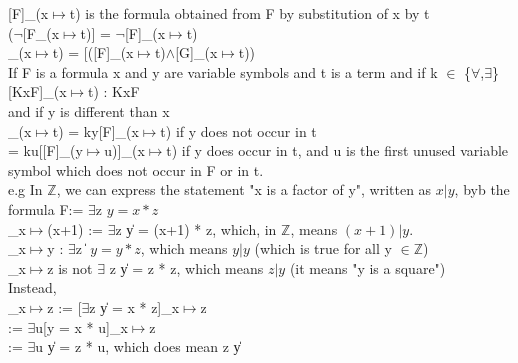 \documentclass[10pt,letter]{article}
\begin{document}
[F]_(x$\mapsto$t) is the formula obtained from F by substitution of x by t\\
($\neg$[F_(x$\mapsto$t)] = $\neg$[F]_(x$\mapsto$t)\\
[(F$\wedge$G)]_(x$\mapsto$t) = [([F]_(x$\mapsto$t)$\wedge$[G]_(x$\mapsto$t))\\
If F is a formula  x and y are variable symbols and t is a term and if k $\in$ \{$\forall$,$\exists$\} [KxF]_(x$\mapsto$t) : KxF\\
and if y is different than x\\
[KyF]_(x$\mapsto$t) = ky[F]_(x$\mapsto$t) if y does not occur in t\\
                    = ku[[F]_(y$\mapsto$u)]_(x$\mapsto$t) if y does occur in t, and u is the first unused variable symbol which does not occur in F or in t.\\
e.g In $\mathbb{Z}$, we can express the statement "x is a factor of y", written as $x|y$, byb the formula F:= $\exists$z $y = x * z$\\
[F]_{x$\mapsto$(x+1)} := $\exists$z \| y = (x+1) * z, which, in $\mathbb{Z}$, means $(x+1)|y$.\\
[F]_{x$\mapsto$y} : $\exists$z \| $y = y * z$, which means $y|y$ (which is true for all y $\in \mathbb{Z}$)\\ 
[F]_{x$\mapsto$z} is not $\exists$ z \| y = z * z, which means $z|y$ (it means "y is a square")\\
Instead,\\ 
[F]_{x$\mapsto$z} := [$\exists$z \|  y = x * z]_{x$\mapsto$z}\\
                := $\exists$u[y = x * u]_{x$\mapsto$z}\\
                := $\exists$u \| y = z * u, which does mean z \| y\\
\end{document}
